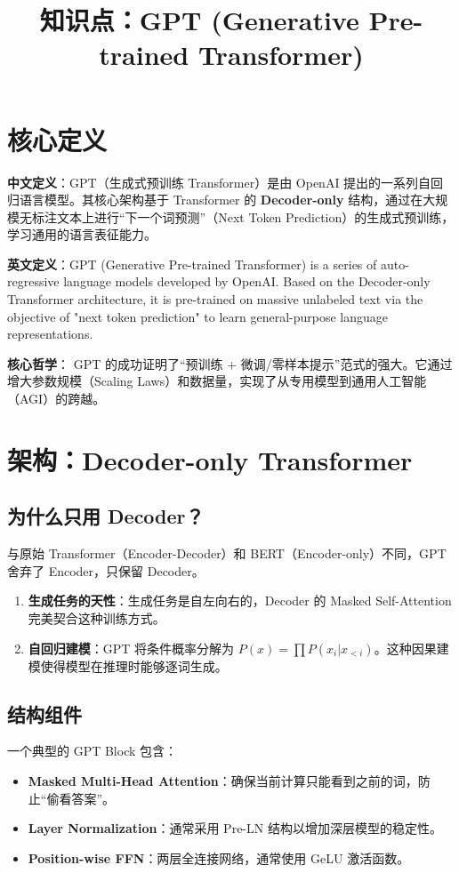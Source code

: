 \documentclass[12pt, a4paper]{article}
\title{知识点：GPT (Generative Pre-trained Transformer)}
\author{}
\date{}
\begin{document}
\maketitle

\section{核心定义}
\textbf{中文定义}：GPT（生成式预训练 Transformer）是由 OpenAI 提出的一系列自回归语言模型。其核心架构基于 Transformer 的 \textbf{Decoder-only} 结构，通过在大规模无标注文本上进行“下一个词预测”（Next Token Prediction）的生成式预训练，学习通用的语言表征能力。

\textbf{英文定义}：GPT (Generative Pre-trained Transformer) is a series of auto-regressive language models developed by OpenAI. Based on the Decoder-only Transformer architecture, it is pre-trained on massive unlabeled text via the objective of "next token prediction" to learn general-purpose language representations.

\textbf{核心哲学}：
GPT 的成功证明了“预训练 + 微调/零样本提示”范式的强大。它通过增大参数规模（Scaling Laws）和数据量，实现了从专用模型到通用人工智能（AGI）的跨越。

\section{架构：Decoder-only Transformer}

\subsection{为什么只用 Decoder？}
与原始 Transformer（Encoder-Decoder）和 BERT（Encoder-only）不同，GPT 舍弃了 Encoder，只保留 Decoder。
\begin{enumerate}
    \item \textbf{生成任务的天性}：生成任务是自左向右的，Decoder 的 Masked Self-Attention 完美契合这种训练方式。
    \item \textbf{自回归建模}：GPT 将条件概率分解为 $P(x) = \prod P(x_i | x_{<i})$。这种因果建模使得模型在推理时能够逐词生成。
\end{enumerate}

\subsection{结构组件}
一个典型的 GPT Block 包含：
\begin{itemize}
    \item \textbf{Masked Multi-Head Attention}：确保当前计算只能看到之前的词，防止“偷看答案”。
    \item \textbf{Layer Normalization}：通常采用 Pre-LN 结构以增加深层模型的稳定性。
    \item \textbf{Position-wise FFN}：两层全连接网络，通常使用 GeLU 激活函数。
\end{itemize}
\end{document}
